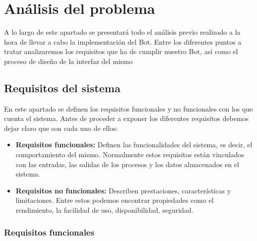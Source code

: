 \chapter{Análisis del problema}
 
A lo largo de este apartado se presentará todo el análisis previo realizado a la hora de llevar a cabo la implementación del Bot. Entre los diferentes puntos a tratar analizaremos los requisitos que ha de cumplir nuestro Bot, así como el proceso de diseño de la interfaz del mismo

\section{Requisitos del sistema}

En este apartado se definen los requisitos funcionales y no funcionales con los que cuenta el sistema. Antes de proceder a exponer los diferentes requisitos debemos dejar claro que son cada uno de ellos:

\begin{itemize}
	\item \textbf{Requisitos funcionales:} Definen las funcionalidades del sistema, es decir, el comportamiento del mismo. Normalmente estos requisitos están vinculados con las entradas, las salidas de los procesos y los datos almacenados en el sistema.
	\item \textbf{Requisitos no funcionales:} Describen prestaciones, características y limitaciones. Entre estos podemos encontrar propiedades como el rendimiento, la facilidad de uso, disponibilidad, seguridad.
\end{itemize}

\subsection{Requisitos funcionales}

